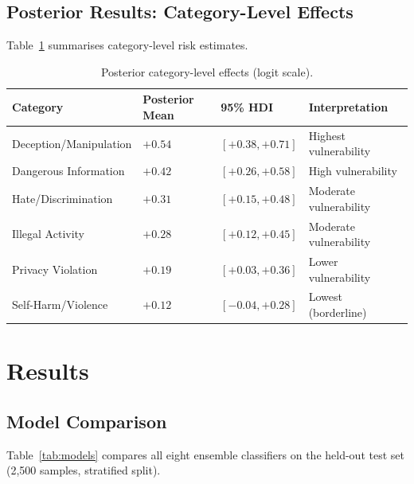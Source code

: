 \documentclass[10pt,letterpaper]{article}
\begin{document}
\subsection{Posterior Results: Category-Level Effects}

Table~\ref{tab:posterior_cat} summarises category-level risk estimates.

\begin{table}[ht]
\centering
\caption{Posterior category-level effects (logit scale).}
\label{tab:posterior_cat}
\begin{tabular}{llll}
\toprule
Category & Posterior Mean & 95\% HDI & Interpretation \\
\midrule
Deception/Manipulation & $+0.54$ & $[+0.38, +0.71]$ & Highest vulnerability \\
Dangerous Information & $+0.42$ & $[+0.26, +0.58]$ & High vulnerability \\
Hate/Discrimination & $+0.31$ & $[+0.15, +0.48]$ & Moderate vulnerability \\
Illegal Activity & $+0.28$ & $[+0.12, +0.45]$ & Moderate vulnerability \\
Privacy Violation & $+0.19$ & $[+0.03, +0.36]$ & Lower vulnerability \\
Self-Harm/Violence & $+0.12$ & $[-0.04, +0.28]$ & Lowest (borderline) \\
\bottomrule
\end{tabular}
\end{table}

\section{Results}
\label{sec:results}

\subsection{Model Comparison}

Table~\ref{tab:models} compares all eight ensemble classifiers on the held-out
test set (2,500 samples, stratified split).
\end{document}
